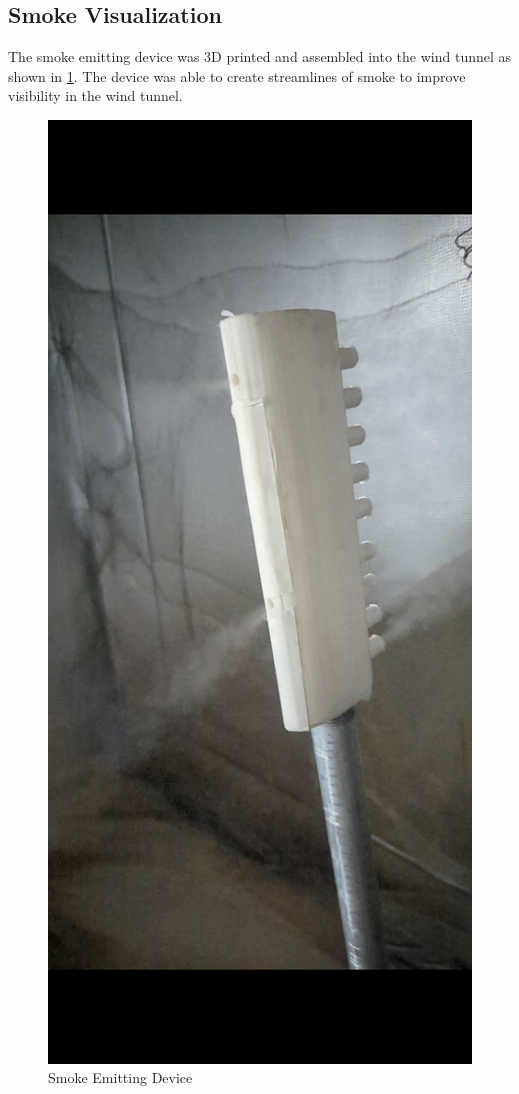 \subsection{Smoke Visualization}
The smoke emitting device was 3D printed and assembled into the wind tunnel as shown in \ref{fig:smoke_res}.
The device was able to create streamlines of smoke to improve visibility in the wind tunnel.
\begin{center}
	\begin{figure}
		\centering
		\includegraphics[width=0.5\linewidth]{Figures/Screenshot_20221211-185935.png}
		\caption[Smoke Emitting Device]{Smoke Emitting Device}
		\label{fig:smoke_res}
	\end{figure}
\end{center}

